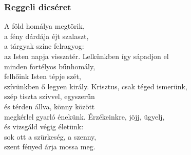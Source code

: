 \documentclass[twoside]{article}
\begin{document}

\subsubsection*{Reggeli dicséret}

\begin{hymnstanzas}
    A föld homálya megtörik,\\
    a fény dárdája éjt szalaszt,\\
    a tárgyak színe felragyog:\\
    az Isten napja visszatér.
\stanzabreak
    Lelkünkben így sápadjon el\\
    minden fortélyos bűnhomály,\\
    felhőink Isten tépje szét,\\
    szívünkben ő legyen király.
\stanzabreak
    Krisztus, csak téged ismerünk,\\
    szép tiszta szívvel, egyszerűn\\
    és térden állva, könny között\\
    megkérlel gyarló énekünk.
\stanzabreak
    Érzékeinkre, jöjj, ügyelj,\\
    és vizsgáld végig életünk:\\
    sok ott a szürkeség, a szenny,\\
    szent fényed árja mossa meg.
\end{hymnstanzas}
\end{document}
